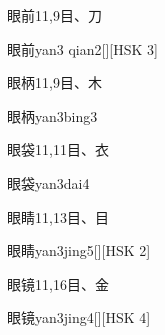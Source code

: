 \begin{entry}{眼前}{11,9}{⽬、⼑}
  \begin{phonetics}{眼前}{yan3 qian2}[][HSK 3]
  \end{phonetics}
\end{entry}

\begin{entry}{眼柄}{11,9}{⽬、⽊}
  \begin{phonetics}{眼柄}{yan3bing3}
  \end{phonetics}
\end{entry}

\begin{entry}{眼袋}{11,11}{⽬、⾐}
  \begin{phonetics}{眼袋}{yan3dai4}
  \end{phonetics}
\end{entry}

\begin{entry}{眼睛}{11,13}{⽬、⽬}
  \begin{phonetics}{眼睛}{yan3jing5}[][HSK 2]
  \end{phonetics}
\end{entry}

\begin{entry}{眼镜}{11,16}{⽬、⾦}
  \begin{phonetics}{眼镜}{yan3jing4}[][HSK 4]
  \end{phonetics}
\end{entry}

